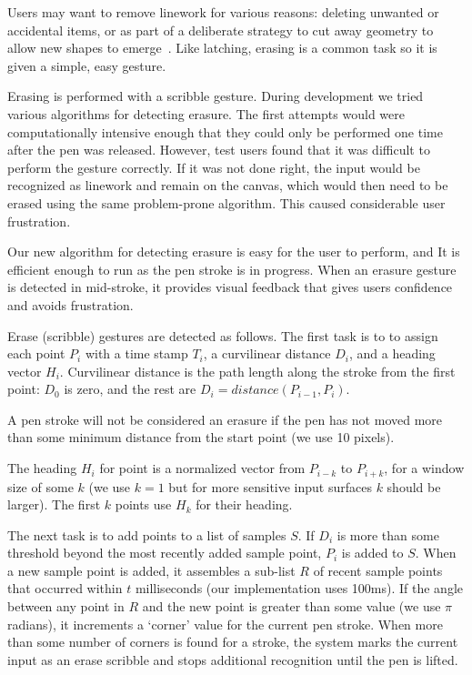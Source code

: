 \documentclass{article}
\begin{document}
Users may want to remove linework for various reasons: deleting
unwanted or accidental items, or as part of a deliberate strategy to
cut away geometry to allow new shapes to
emerge~\cite{zeleznik-lineogrammer}. Like latching, erasing is a
common task so it is given a simple, easy gesture.

Erasing is performed with a scribble gesture. During development we
tried various algorithms for detecting erasure. The first attempts
would were computationally intensive enough that they could only be
performed one time after the pen was released. However, test users
found that it was difficult to perform the gesture correctly. If it
was not done right, the input would be recognized as linework and
remain on the canvas, which would then need to be erased using the
same problem-prone algorithm. This caused considerable user
frustration.

Our new algorithm for detecting erasure is easy for the user to
perform, and It is efficient enough to run as the pen stroke is in
progress. When an erasure gesture is detected in mid-stroke, it
provides visual feedback that gives users confidence and avoids
frustration.

Erase (scribble) gestures are detected as follows. The first task is
to to assign each point $P_i$ with a time stamp $T_i$, a curvilinear
distance $D_i$, and a heading vector $H_i$. Curvilinear distance is
the path length along the stroke from the first point: $D_0$ is zero,
and the rest are $D_i = distance(P_{i-1}, P_i)$.

A pen stroke will not be considered an erasure if the pen has not
moved more than some minimum distance from the start point (we use 10
pixels).

The heading $H_i$ for point is a normalized vector from $P_{i-k}$ to
$P_{i+k}$, for a window size of some $k$ (we use $k=1$ but for more
sensitive input surfaces $k$ should be larger). The first $k$ points
use $H_k$ for their heading.

The next task is to add points to a list of samples $S$. If $D_i$ is
more than some threshold beyond the most recently added sample point,
$P_i$ is added to $S$. When a new sample point is added, it assembles
a sub-list $R$ of recent sample points that occurred within $t$
milliseconds (our implementation uses 100ms). If the angle between any
point in $R$ and the new point is greater than some value (we use $\pi$
radians), it increments a `corner' value for the current pen
stroke. When more than some number of corners is found for a stroke,
the system marks the current input as an erase scribble and stops
additional recognition until the pen is lifted.
\end{document}

